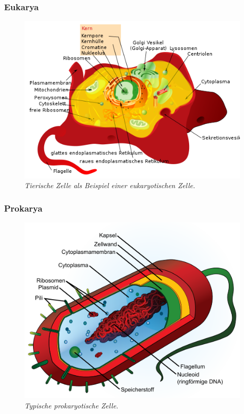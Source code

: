 \subsubsection{Eukarya}
	\begin{figure}[ht!]
	\leavevmode
	\begin{center}
	\includegraphics[scale=0.47]{./pictures/animal_cell_500}
	\end{center}
	\caption{\slshape{Tierische Zelle als Beispiel einer eukaryotischen Zelle.}}
	\label{fig:eukarya}
	\end{figure}

\subsubsection{Prokarya}
	\begin{figure}[ht!]
	\leavevmode
	\begin{center}
	\includegraphics[scale=0.47]{./pictures/avg_prokaryote_cell_500}
	\end{center}
	\caption{\slshape{Typische prokaryotische Zelle.}}
	\label{fig:prokarya}
	\end{figure}

